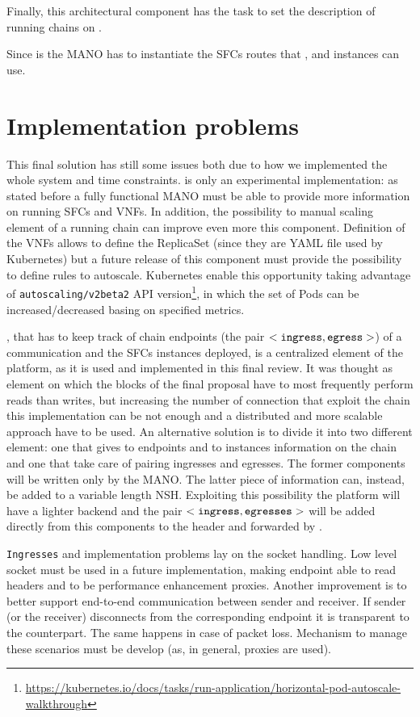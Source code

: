 Finally, this architectural component has the task to set the description of
running chains on \roulette{}.

Since \harbor{} is the MANO has to instantiate the SFCs routes that 
\ingresses{}, \egresses{} and \astaire{} instances can use. 

\section{Implementation problems} \label{chap:impl:sec:problems}
This final solution has still some issues both due to how we implemented the
whole system and time constraints. \harbor{} is only an experimental
implementation: as stated before a fully functional MANO must be able to provide
more information on running SFCs and VNFs. In addition, the possibility to
manual scaling element of a running chain can improve even more this component.
Definition of the VNFs allows to define the ReplicaSet (since they are YAML
file used by Kubernetes) but a future release of this component must provide
the possibility to define rules to autoscale. Kubernetes enable this
opportunity taking advantage of \texttt{autoscaling/v2beta2} API
version\footnote{\sloppy\url{https://kubernetes.io/docs/tasks/run-application/horizontal-pod-autoscale-walkthrough}},
in which the set of Pods can be increased/decreased basing on specified metrics.

\roulette{}, that has to keep track of chain endpoints (the pair $<\texttt{ingress}{},
\texttt{egress}{}>$) of a communication and the SFCs instances deployed, is a
centralized element of the platform, as it is used and implemented in this final
review. It was thought as element on which the blocks of the final proposal have
to most frequently perform reads than writes, but increasing the number of
connection that exploit the chain this implementation can be not enough and a
distributed and more scalable approach have to be used. An alternative solution
is to divide it into two different element: one that gives to endpoints and to 
\astaire{} instances information on the chain and one that take care of pairing
ingresses and egresses. The former components will be written only by the MANO.
The latter piece of information can, instead, be added to a variable length NSH.
Exploiting this possibility the platform will have a lighter backend and the
pair $<\texttt{ingress}{}, \texttt{egresses}{}>$ will be added directly from this components to
the header and forwarded by \astaire{}. 

\texttt{Ingresses} and \egresses{} implementation problems lay on the socket
handling. Low level socket must be used in a future implementation, making
endpoint able to read headers and to be performance enhancement proxies. Another
improvement is to better support end-to-end communication between sender and
receiver. If sender (or the receiver) disconnects from the corresponding
endpoint it is transparent to the counterpart. The same happens in case of
packet loss. Mechanism to manage these scenarios must be develop (as, in
general, proxies are used).

